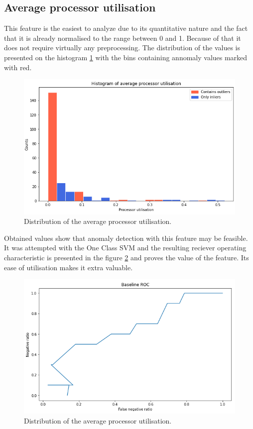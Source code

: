 \documentclass[a4paper,twoside,12pt]{book}
\begin{document}

\subsection{Average processor utilisation}

This feature is the easiest to analyze due to its quantitative nature and the fact that it is
already normalised to the range between 0 and 1. Because of that it does not require virtually 
any preprocessing. The distribution of the values is presented on the histogram \ref{fig:histavgproc}
with the bins containing annomaly values marked with red. 

\begin{figure}
	\centering
	\includegraphics[scale=0.9]{images/HistAvgProcs}
	\caption{Distribution of the average processor utilisation.}
	\label{fig:histavgproc}
 \end{figure}

Obtained values show that anomaly detection with this feature may be feasible. It was attempted with 
the One Class SVM and the resulting reciever operating characteristic is presented in the figure
\ref{fig:procroc} and proves the value of the feature. Its ease of utilisation makes it extra valuable.

\begin{figure}
	\centering
	\includegraphics[scale=0.9]{images/ProcROC}
	\caption{Distribution of the average processor utilisation.}
	\label{fig:procroc}
 \end{figure}
\end{document}
